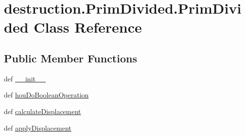 \hypertarget{classdestruction_1_1_prim_divided_1_1_prim_divided}{\section{destruction.\-Prim\-Divided.\-Prim\-Divided Class Reference}
\label{classdestruction_1_1_prim_divided_1_1_prim_divided}
}
\subsection*{Public Member Functions}
\begin{DoxyCompactItemize}
\item 
def \hyperlink{classdestruction_1_1_prim_divided_1_1_prim_divided_a1f40726ee092b5cda7d7c12414e8a492}{\-\_\-\-\_\-init\-\_\-\-\_\-}
\item 
def \hyperlink{classdestruction_1_1_prim_divided_1_1_prim_divided_ab8613483d98853aea3766fb88d08b470}{hou\-Do\-Boolean\-Operation}
\item 
def \hyperlink{classdestruction_1_1_prim_divided_1_1_prim_divided_adccfcd91ae661803963e0fa4e41598d3}{calculate\-Displacement}
\item 
def \hyperlink{classdestruction_1_1_prim_divided_1_1_prim_divided_a0ce8255cd69d324804545d359352239d}{apply\-Displacement}
\end{DoxyCompactItemize}

